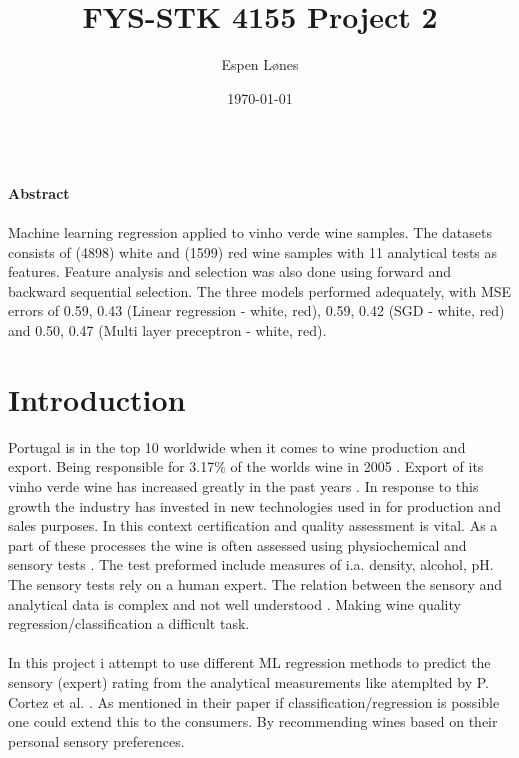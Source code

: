 \documentclass[12pt, letterpaper, twoside]{article}
\begin{document}
\title{FYS-STK 4155 Project 2}
\author{Espen Lønes}
\date{\today}
\maketitle
\ \\
\textbf{Abstract}\\
\ \\
Machine learning regression applied to vinho verde wine samples. The datasets consists of (4898) white and (1599) red wine samples with 11 analytical tests as features. Feature analysis and selection was also done using forward and backward sequential selection. The three models performed adequately, with MSE errors of 0.59, 0.43 (Linear regression - white, red), 0.59, 0.42 (SGD - white, red) and 0.50, 0.47 (Multi layer preceptron - white, red).\\
\section{Introduction}
Portugal is in the top 10 worldwide when it comes to wine production and export. Being responsible for    3.17\% of the worlds wine in 2005 \cite{FAO}. Export of its vinho verde wine has increased greatly in the past years \cite{CVRVV}. In response to this growth the industry has invested in new technologies used in for production and sales purposes. In this context certification and quality assessment is vital. As a part of these processes the wine is often assessed using physiochemical and sensory tests \cite{Ebeler}. The test preformed include measures of i.a. density, alcohol, pH. The sensory tests rely on a human expert. The relation between the sensory and analytical data is complex and not well understood \cite{PvS}. Making wine quality regression/classification a difficult task.\\
\ \\
In this project i attempt to use different ML regression methods to predict the sensory (expert) rating from the analytical measurements like atemplted by P. Cortez et al. \cite{Citation paper}. As mentioned in their paper if classification/regression is possible one could extend this to the consumers. By recommending wines based on their personal sensory preferences.\\
\newpage
\ \\
\end{document}
